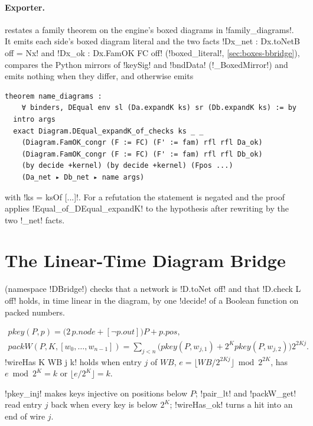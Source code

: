 {\paragraph{Exporter.}  restates a family theorem on the engine's boxed diagrams in \py!family_diagrams!. It emits each side's boxed diagram literal and the two facts \lbx!Dx_net : Dx.toNetB off = Nx! and \lbx!Dx_ok : Dx.FamOK FC off! (\py!boxed_literal!, \cref{sec:boxes-bbridge}), compares the Python mirrors of \lbx!keySig! and \lbx!bndData! (\py!_BoxedMirror!) and emits nothing when they differ, and otherwise emits
\begin{lstlisting}[style=leanbox]
theorem name_diagrams :
    ∀ binders, DEqual env sl (Da.expandK ks) sr (Db.expandK ks) := by
  intro args
  exact Diagram.DEqual_expandK_of_checks ks _ _
    (Diagram.FamOK_congr (F := FC) (F' := fam) rfl rfl Da_ok)
    (Diagram.FamOK_congr (F := FC) (F' := fam) rfl rfl Db_ok)
    (by decide +kernel) (by decide +kernel) (Fpos ...)
    (Da_net ▸ Db_net ▸ name args)
\end{lstlisting}
with \lbx!ks = ksOf [...]!. For a refutation the statement is negated and the proof applies \lbx!Equal_of_DEqual_expandK! to the hypothesis after rewriting by the two \lbx!_net! facts.

\section{The Linear-Time Diagram Bridge}\label{sec:boxes-dbridge}

 (namespace \lbx!DBridge!) checks that a network is \lbx!D.toNet off! and that \lbx!D.check L off! holds, in time linear in the diagram, by one \lbx!decide! of a Boolean function on packed numbers.

\begin{definition}\label{def:boxes-pkey}
\begin{gather*}
\mathit{pkey}(P,p)=\bigl(2\,p.\mathit{node}+[\neg p.\mathit{out}]\bigr)P+p.\mathit{pos},\\
\mathit{packW}(P,K,[w_0,\dots,w_{n-1}])=\sum_{j<n}\bigl(\mathit{pkey}(P,w_{j,1})+2^K\mathit{pkey}(P,w_{j,2})\bigr)2^{2Kj}.
\end{gather*}
\lbx!wireHas K WB j k! holds when entry $j$ of $\mathit{WB}$, $e=\lfloor\mathit{WB}/2^{2Kj}\rfloor\bmod 2^{2K}$, has $e\bmod 2^K=k$ or $\lfloor e/2^K\rfloor=k$.
\end{definition}
\lbx!pkey_inj! makes keys injective on positions below $P$; \lbx!pair_lt! and \lbx!packW_get! read entry $j$ back when every key is below $2^K$; \lbx!wireHas_ok! turns a hit into an end of wire $j$.

}
